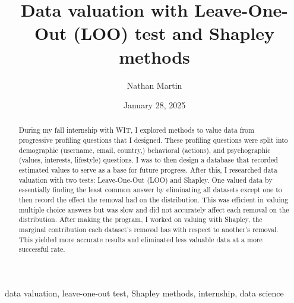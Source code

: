 ﻿\documentclass[12pt,conference,onecolumn]{IEEEtran}
\title{Data valuation with Leave-One-Out (LOO) test and Shapley methods}
\author{Nathan Martin}
\date{January 28, 2025}
\newcommand{\keywords}{data valuation, leave-one-out test, Shapley methods, internship, data science}
\begin{document}
\maketitle 

\begin{abstract}
During my fall internship with WIT, I explored methods to value  data from progressive profiling questions that I designed. These profiling questions were split into demographic (username, email, country,) behavioral (actions), and psychographic (values, interests, lifestyle) questions. I was to then design a database that recorded estimated values to serve as a base for future progress. After this, I researched data valuation with two tests: Leave-One-Out (LOO) and Shapley. One valued data by essentially finding the least common answer by eliminating all datasets except one to then record the effect the removal had on the distribution. This was efficient in valuing multiple choice answers but was slow and did not accurately affect each removal on the distribution. After making the program, I worked on valuing with Shapley, the marginal contribution each dataset’s removal has with respect to another’s removal. This yielded more accurate results and eliminated less valuable data at a more successful rate.
\end{abstract}

\begin{IEEEkeywords}
\keywords
\end{IEEEkeywords}
\end{document}
